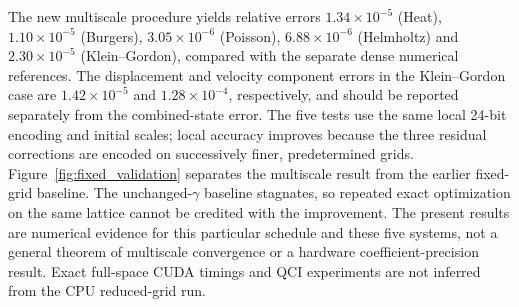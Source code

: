 The new multiscale procedure yields relative errors
$1.34\times10^{-5}$ (Heat), $1.10\times10^{-5}$ (Burgers),
$3.05\times10^{-6}$ (Poisson), $6.88\times10^{-6}$ (Helmholtz) and
$2.30\times10^{-5}$ (Klein--Gordon), compared with the separate dense
numerical references. The displacement and velocity component errors in
the Klein--Gordon case are $1.42\times10^{-5}$ and $1.28\times10^{-4}$,
respectively, and should be reported separately from the combined-state
error. The five tests use the same local 24-bit encoding and initial scales;
local accuracy improves because the three residual corrections are encoded
on successively finer, predetermined grids. Figure~\ref{fig:fixed_validation}
separates the multiscale result from the earlier fixed-grid baseline.
The unchanged-$\gamma$ baseline stagnates, so repeated exact optimization
on the same lattice cannot be credited with the improvement. The present
results are numerical evidence for this particular schedule and these
five systems, not a general theorem of multiscale convergence or a
hardware coefficient-precision result. Exact full-space CUDA timings and
QCI experiments are not inferred from the CPU reduced-grid run.

